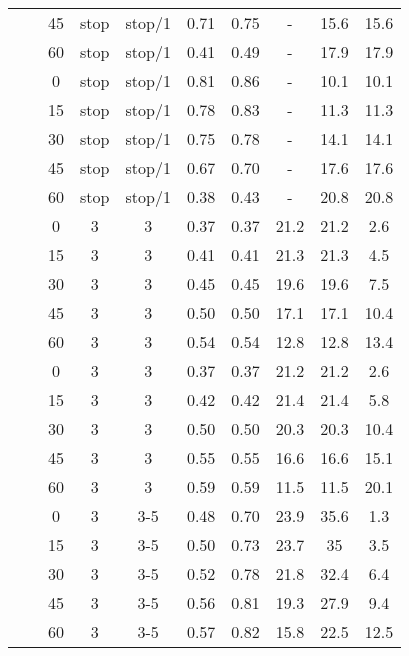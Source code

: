 \begin{longtable}[t]{cccccccccc}
\nopagebreak
&  & 45 & stop & stop/1 & 0.71 & 0.75 & - & 15.6 & 15.6\\
\nopagebreak
& \multirow{-5}{*}{\centering\arraybackslash 0.2} & 60 & stop & stop/1 & 0.41 & 0.49 & - & 17.9 & 17.9\\
\nopagebreak
&  & 0 & stop & stop/1 & 0.81 & 0.86 & - & 10.1 & 10.1\\
\nopagebreak
&  & 15 & stop & stop/1 & 0.78 & 0.83 & - & 11.3 & 11.3\\
\nopagebreak
&  & 30 & stop & stop/1 & 0.75 & 0.78 & - & 14.1 & 14.1\\
\nopagebreak
&  & 45 & stop & stop/1 & 0.67 & 0.70 & - & 17.6 & 17.6\\
\nopagebreak
\multirow{-10}{*}{\centering\arraybackslash 5} & \multirow{-5}{*}{\centering\arraybackslash 0.33} & 60 & stop & stop/1 & 0.38 & 0.43 & - & 20.8 & 20.8\\
\cmidrule{1-10}\pagebreak[0]
&  & 0 & 3 & 3 & 0.37 & 0.37 & 21.2 & 21.2 & 2.6\\
\nopagebreak
&  & 15 & 3 & 3 & 0.41 & 0.41 & 21.3 & 21.3 & 4.5\\
\nopagebreak
&  & 30 & 3 & 3 & 0.45 & 0.45 & 19.6 & 19.6 & 7.5\\
\nopagebreak
&  & 45 & 3 & 3 & 0.50 & 0.50 & 17.1 & 17.1 & 10.4\\
\nopagebreak
& \multirow{-5}{*}{\centering\arraybackslash 0.2} & 60 & 3 & 3 & 0.54 & 0.54 & 12.8 & 12.8 & 13.4\\
\nopagebreak
&  & 0 & 3 & 3 & 0.37 & 0.37 & 21.2 & 21.2 & 2.6\\
\nopagebreak
&  & 15 & 3 & 3 & 0.42 & 0.42 & 21.4 & 21.4 & 5.8\\
\nopagebreak
&  & 30 & 3 & 3 & 0.50 & 0.50 & 20.3 & 20.3 & 10.4\\
\nopagebreak
&  & 45 & 3 & 3 & 0.55 & 0.55 & 16.6 & 16.6 & 15.1\\
\nopagebreak
\multirow{-10}{*}{\centering\arraybackslash 6} & \multirow{-5}{*}{\centering\arraybackslash 0.33} & 60 & 3 & 3 & 0.59 & 0.59 & 11.5 & 11.5 & 20.1\\
\cmidrule{1-10}\pagebreak[0]
&  & 0 & 3 & 3-5 & 0.48 & 0.70 & 23.9 & 35.6 & 1.3\\
\nopagebreak
&  & 15 & 3 & 3-5 & 0.50 & 0.73 & 23.7 & 35 & 3.5\\
\nopagebreak
&  & 30 & 3 & 3-5 & 0.52 & 0.78 & 21.8 & 32.4 & 6.4\\
\nopagebreak
&  & 45 & 3 & 3-5 & 0.56 & 0.81 & 19.3 & 27.9 & 9.4\\
\nopagebreak
& \multirow{-5}{*}{\centering\arraybackslash 0.2} & 60 & 3 & 3-5 & 0.57 & 0.82 & 15.8 & 22.5 & 12.5\\

\end{longtable}
